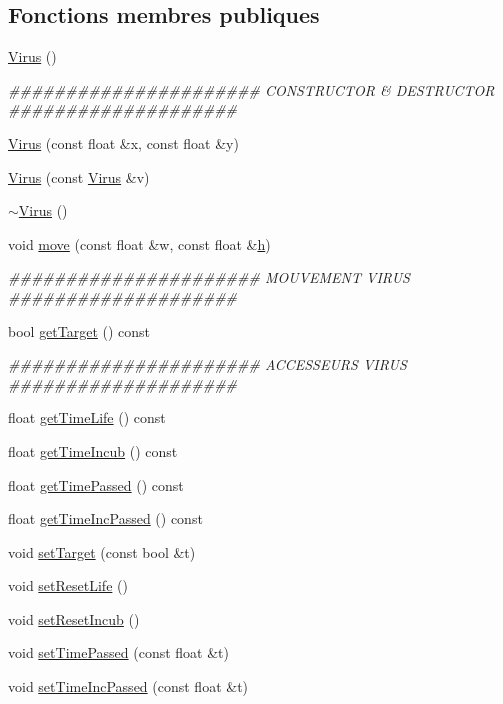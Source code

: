 \subsection*{Fonctions membres publiques}
\begin{DoxyCompactItemize}
\item 
\hyperlink{classVirus_a8d2b6d6312a36c3d364659b7f8fc5580}{Virus} ()
\begin{DoxyCompactList}\small\item\em \#\#\#\#\#\#\#\#\#\#\#\#\#\#\#\#\#\#\#\#\#\# CONSTRUCTOR \& DESTRUCTOR \#\#\#\#\#\#\#\#\#\#\#\#\#\#\#\#\#\#\#\# \end{DoxyCompactList}\item 
\hyperlink{classVirus_acf2e4fb745ef21060166abf48933f2e7}{Virus} (const float \&x, const float \&y)
\item 
\hyperlink{classVirus_a99648c8fe90427870df5e615782f8d31}{Virus} (const \hyperlink{classVirus}{Virus} \&v)
\item 
\hyperlink{classVirus_ad153520d85db2799257721d5baaebbcc}{$\sim$Virus} ()
\item 
void \hyperlink{classVirus_a517c00809952ed976f123436f0cbc415}{move} (const float \&w, const float \&\hyperlink{classUnite_1_1h}{h})
\begin{DoxyCompactList}\small\item\em \#\#\#\#\#\#\#\#\#\#\#\#\#\#\#\#\#\#\#\#\#\# MOUVEMENT VIRUS \#\#\#\#\#\#\#\#\#\#\#\#\#\#\#\#\#\#\#\# \end{DoxyCompactList}\item 
bool \hyperlink{classVirus_ac6b08e21db80f69c56b8255e33cf45fd}{getTarget} () const 
\begin{DoxyCompactList}\small\item\em \#\#\#\#\#\#\#\#\#\#\#\#\#\#\#\#\#\#\#\#\#\# ACCESSEURS VIRUS \#\#\#\#\#\#\#\#\#\#\#\#\#\#\#\#\#\#\#\# \end{DoxyCompactList}\item 
float \hyperlink{classVirus_a2ecb866c913d90c83cff29b74056ea8c}{getTimeLife} () const 
\item 
float \hyperlink{classVirus_a42818314efd64727478570d8642a37fd}{getTimeIncub} () const 
\item 
float \hyperlink{classVirus_ab50e2f7230da1205aa6cb1930c22eec0}{getTimePassed} () const 
\item 
float \hyperlink{classVirus_a534241108ade2c64fdbcbf03ae382315}{getTimeIncPassed} () const 
\item 
void \hyperlink{classVirus_a458881d716992cdea91af5b2bb9c59b5}{setTarget} (const bool \&t)
\item 
void \hyperlink{classVirus_aaa6a9f96616db60aeb05edfebfb67830}{setResetLife} ()
\item 
void \hyperlink{classVirus_add324ec78ef4bfc077ef5e6a4ca78272}{setResetIncub} ()
\item 
void \hyperlink{classVirus_a44667f6e6de28deaeee25d0388160c5f}{setTimePassed} (const float \&t)
\item 
void \hyperlink{classVirus_a2490bcb3bc3db94d9c956361b19f342d}{setTimeIncPassed} (const float \&t)
\end{DoxyCompactItemize}
